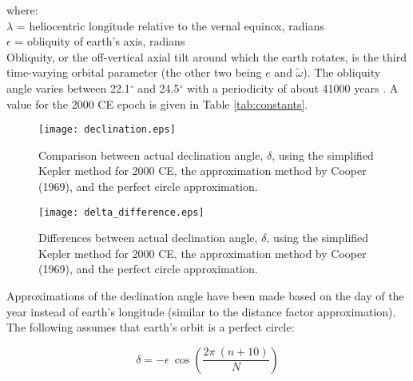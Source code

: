 \noindent where: \\
\indent $\lambda$ = heliocentric longitude relative to the vernal equinox, radians\\
\indent $\epsilon$ = obliquity of earth's axis, radians\\

Obliquity, or the off-vertical axial tilt around which the earth rotates, is the third time-varying orbital parameter (the other two being $e$ and $\tilde{\omega}$).  
The obliquity angle varies between 22.1$^{\circ}$ and 24.5$^{\circ}$ with a periodicity of about 41000 years \parencite{hays76,berger77}. 
A value for the 2000 CE epoch is given in Table \ref{tab:constants}.

\begin{figure}[ht!]
    \texttt{[image: declination.eps]}
    \caption{Comparison between actual declination angle, $\delta$, using the simplified Kepler method for 2000 CE, the approximation method by Cooper (1969), and the perfect circle approximation.}
    \label{fig:delta}
\end{figure}

\begin{figure}[ht!]
    \texttt{[image: delta\_difference.eps]}
    \caption{Differences between actual declination angle, $\delta$, using the simplified Kepler method for 2000 CE, the approximation method by Cooper (1969), and the perfect circle approximation.}
    \label{fig:ddiff}
\end{figure}

Approximations of the declination angle have been made based on the day of the year instead of earth's longitude (similar to the distance factor approximation). 
The following assumes that earth's orbit is a perfect circle:

\begin{equation}
\label{eq:deltab}
    \delta = -\epsilon\:\cos\left(\frac{2\pi\:(n+10)}{N} \right)
\end{equation}

